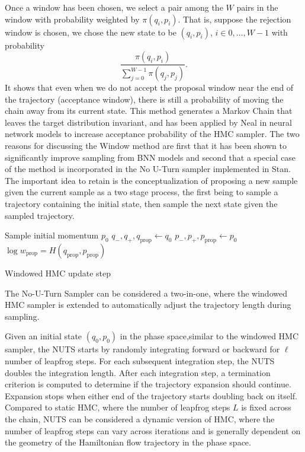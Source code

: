 \documentclass[12pt]{report}
\begin{document}
Once a window has been chosen, we select a pair among the $W$ pairs in the window with probability weighted by $\pi(q_i,p_i)$. That is, suppose the rejection window is chosen, we chose the new state to be $(q_i,p_i)$, $i \in {0,\dots,W-1}$ with probability 
\[ \frac{\pi(q_i,p_i)}{\sum_{j=0}^{W-1} \pi(q_j,p_j)}. \]
It shows that even when we do not accept the proposal window near the end of the trajectory (acceptance window), there is still a probability of moving the chain away from its current state. This method generates a Markov Chain that leaves the target distribution invariant, and has been applied by Neal in neural network models to increase acceptance probability of the HMC sampler\cite{neal1992improved}. The two reasons for discussing the Window method are first that it has been shown to
significantly improve sampling from BNN models and second that a special case of
the method is incorporated in the No U-Turn sampler implemented in Stan. The important idea to retain is the conceptualization of proposing a new sample given the current sample as a two stage process, the first being to sample a trajectory containing the initial state, then sample the next state given the sampled trajectory.

\begin{algorithm}
Sample initial momentum $p_0$ \;
$q_-,q_+, q_{\text{prop}} \leftarrow q_0$\;
$p_-,p_+, p_{\text{prop}} \leftarrow p_0$ \;
$\log w_{\text{prop}} = H(q_{\text{prop}},p_{\text{prop}}) $ \;

\caption{Windowed HMC update step}
\end{algorithm}

The No-U-Turn Sampler \cite{hoffman2014no} can be considered a two-in-one, where the windowed HMC sampler is extended to automatically adjust the trajectory length during sampling. 

Given an initial state $(q_0,p_0)$ in the phase space,similar to the windowed HMC sampler, the NUTS starts by randomly integrating forward or backward for $\ell$ number of leapfrog steps. For each subsequent integration step, the NUTS doubles the integration length. After each integration step, a termination criterion is computed to determine if the trajectory expansion should continue. Expansion stops when either end of the trajectory starts doubling back on itself. Compared to static HMC, where the number of leapfrog steps $L$ is fixed across the chain, NUTS can be considered a dynamic version of HMC, where the number of leapfrog steps can vary across iterations and is generally dependent on the geometry of the Hamiltonian flow trajectory in the phase space. 
\end{document}
